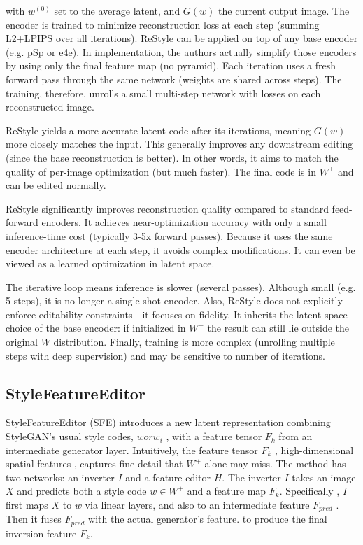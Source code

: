 with $w^{(0)}$ set to the average latent, and $G(w)$ the current output image. 
 The encoder is trained to minimize reconstruction loss at each step (summing L2+LPIPS over all iterations).
 ReStyle can be applied on top of any base encoder (e.g. pSp or e4e). In implementation, the authors actually simplify those encoders by using only the final feature map (no pyramid). Each iteration uses a fresh forward pass through the same network (weights are shared across steps).
The training, therefore, unrolls a small multi-step network with losses on each reconstructed image.

ReStyle yields a more accurate latent code after its iterations, meaning $G(w)$ more closely matches the input. 
This generally improves any downstream editing (since the base reconstruction is better). 
In other words, it aims to match the quality of per-image optimization (but much faster). 
The final code is in $W^+$ and can be edited normally.


ReStyle significantly improves reconstruction quality compared to standard feed-forward encoders. 
It achieves near-optimization accuracy with only a small inference-time cost (typically 3-5x forward passes).
 Because it uses the same encoder architecture at each step, it avoids complex modifications. It can even be viewed as a learned optimization in latent space.

The iterative loop means inference is slower (several passes). 
Although small (e.g. 5 steps), it is no longer a single-shot encoder.
Also, ReStyle does not explicitly enforce editability constraints - it focuses on fidelity. 
It inherits the latent space choice of the base encoder: if initialized in $W^+$
the result can still lie outside the original $W$ distribution. Finally, training is more complex (unrolling multiple steps with deep supervision) and may be sensitive to number of iterations. \citep{alaluf2021restyleresidualbasedstyleganencoder}

\subsection{StyleFeatureEditor}


StyleFeatureEditor (SFE) introduces a new latent representation combining StyleGAN's usual style codes, $w or w_i$ , with a feature tensor $F_k$  from an intermediate generator layer. Intuitively, the feature tensor
$F_k$ , high-dimensional spatial features , captures fine detail that $W^+$ alone may miss. 
 The method has two networks: an inverter $I$ and a feature editor $H$.  The inverter $I$ takes an image $X$ and predicts both a style code
 $w \in W^+$ and a feature map $F_k$. 
 Specifically , $I$ first maps $X$ to $w$ via linear layers, and also to an intermediate feature $F_{pred}$ . Then it fuses $F_{pred}$ with the actual generator’s feature.
 to produce the final inversion feature $F_k$.

